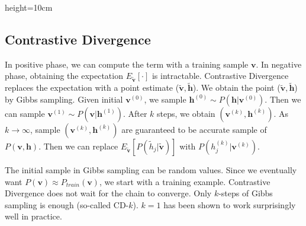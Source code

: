\begin{soln}{height=10cm}
\end{soln}

\subsection*{Contrastive Divergence}
In positive phase, we can compute the term with a training sample $\textbf{v}$. 
In negative phase, obtaining the expectation $E_{\tilde{\textbf{v}}}[\cdot]$ is intractable.
Contrastive Divergence replaces the expectation with a point estimate ($\tilde{\textbf{v}}, \tilde{\textbf{h}}$).
We obtain the point ($\tilde{\textbf{v}}, \tilde{\textbf{h}}$) by Gibbs sampling.
Given initial $\textbf{v}^{(0)}$, we sample $\textbf{h}^{(0)}\sim P(\textbf{h}|\textbf{v}^{(0)})$. Then we can sample $\textbf{v}^{(1)}\sim P(\textbf{v}|\textbf{h}^{(1)})$. 
After $k$ steps, we obtain $(\textbf{v}^{(k)},\textbf{h}^{(k)})$. 
As $k\rightarrow\infty$, sample $(\textbf{v}^{(k)},\textbf{h}^{(k)})$ are guaranteed to be accurate sample of $P(\textbf{v}, \textbf{h})$.
Then we can replace $E_{\tilde{\textbf{v}}}[P(\tilde{h}_j | \tilde{\textbf{v}})]$ with $P(h^{(k)}_j | \textbf{v}^{(k)})$.

\begin{center}
\end{center}

The initial sample in Gibbs sampling can be random values. 
Since we eventually want $P(\textbf{v})\approx P_{train}(\textbf{v})$, we start with a training example. 
Contrastive Divergence does not wait for the chain to converge. 
Only $k$-steps of Gibbs sampling is enough (so-called CD-$k$). 
$k=1$ has been shown to work surprisingly well in practice.


